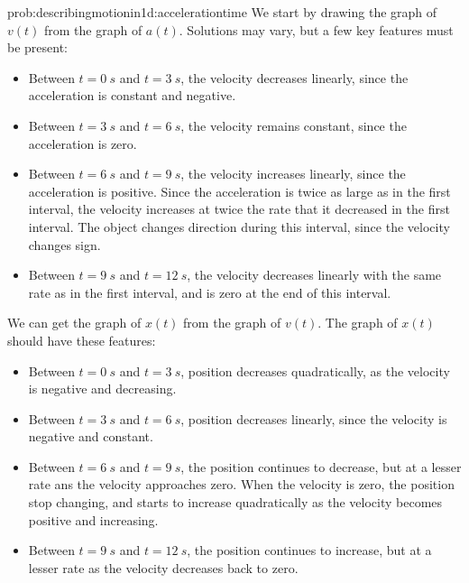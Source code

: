 \newpage
\begin{solution}{prob:describingmotionin1d:accelerationtime}\label{soln:describingmotionin1d:accelerationtime}
We start by drawing the graph of $v(t)$ from the graph of $a(t)$. Solutions may vary, but a few key features must be present:
\begin{itemize}
\item Between $t=\SI{0}{s}$ and $t=\SI{3}{s}$, the velocity decreases linearly, since the acceleration is constant and negative.
\item Between $t=\SI{3}{s}$ and $t=\SI{6}{s}$, the velocity remains constant, since the acceleration is zero.
\item Between $t=\SI{6}{s}$ and $t=\SI{9}{s}$, the velocity increases linearly, since the acceleration is positive. Since the acceleration is twice as large as in the first interval, the velocity increases at twice the rate that it decreased in the first interval. The object changes direction during this interval, since the velocity changes sign.
\item Between $t=\SI{9}{s}$ and $t=\SI{12}{s}$, the velocity decreases linearly with the same rate as in the first interval, and is zero at the end of this interval.
\end{itemize}
We can get the graph of $x(t)$ from the graph of $v(t)$. The graph of $x(t)$ should have these features:
\begin{itemize}
\item Between $t=\SI{0}{s}$ and $t=\SI{3}{s}$, position decreases quadratically, as the velocity is negative and decreasing.
\item Between $t=\SI{3}{s}$ and $t=\SI{6}{s}$, position decreases linearly, since the velocity is negative and constant.
\item Between $t=\SI{6}{s}$ and $t=\SI{9}{s}$, the position continues to decrease, but at a lesser rate ans the velocity approaches zero. When the velocity is zero, the position stop changing, and starts to increase quadratically as the velocity becomes positive and increasing.
\item Between $t=\SI{9}{s}$ and $t=\SI{12}{s}$, the position continues to increase, but at a lesser rate as the velocity decreases back to zero.
\end{itemize}
\end{solution}


